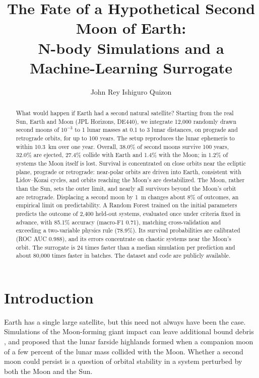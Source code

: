 \documentclass[twocolumn]{aastex631}
\begin{document}
\title{The Fate of a Hypothetical Second Moon of Earth:\\
N-body Simulations and a Machine-Learning Surrogate}

\author{John Rey Ishiguro Quizon}

\begin{abstract}
What would happen if Earth had a second natural satellite? Starting from the real Sun, Earth and
Moon (JPL Horizons, DE440), we integrate 12,000 randomly drawn second moons of $10^{-3}$ to 1 lunar
masses at 0.1 to 3 lunar distances, on prograde and retrograde orbits, for up to 100 years. The
setup reproduces the lunar ephemeris to within 10.3~km over one year. Overall, 38.0\% of second
moons survive 100 years, 32.0\% are ejected, 27.4\% collide with Earth and 1.4\% with the Moon; in
1.2\% of systems the Moon itself is lost. Survival is concentrated on close orbits near the
ecliptic plane, prograde or retrograde: near-polar orbits are driven into Earth, consistent with Lidov--Kozai cycles, and orbits reaching
the Moon's are destabilized. The Moon, rather than the Sun, sets the outer limit, and nearly all
survivors beyond the Moon's orbit are retrograde. Displacing a second moon by 1~m changes about 8\%
of outcomes, an empirical limit on predictability. A Random Forest trained on the initial parameters
predicts the outcome of 2,400 held-out systems, evaluated once under criteria fixed in advance,
with 85.1\% accuracy (macro-F1 0.71), matching cross-validation and exceeding a two-variable physics
rule (78.9\%). Its survival probabilities are calibrated (ROC AUC 0.988), and its errors concentrate
on chaotic systems near the Moon's orbit. The surrogate is 24 times faster than a median simulation
per prediction and about 80,000 times faster in batches. The dataset and code are publicly
available.
\end{abstract}


\section{Introduction} \label{sec:intro}

Earth has a single large satellite, but this need not always have been the case. Simulations of
the Moon-forming giant impact can leave additional bound debris \citep{Canup2001}, and
\citet{Jutzi2011} proposed that the lunar farside highlands formed when a companion moon of a few
percent of the lunar mass collided with the Moon. Whether a second moon could persist is a
question of orbital stability in a system perturbed by both the Moon and the Sun.
\end{document}
